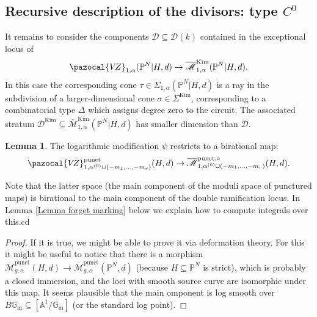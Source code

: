 \documentclass[11pt]{amsart}
\newcommand{\Kim}{\operatorname{Kim}}
\newcommand{\Mpunct}[4]{\overline{\mathcal{M}}^{\operatorname{punct}}_{#1,#2}(#3,#4)}
\newcommand{\PP}{\mathbb P}
\newcommand{\VZ}{\pazocal{V\!Z}}
\renewcommand{\to}{\rightarrow}
\newcommand{\Aaff}{\mathbb{A}}
\newcommand{\Gm}{\mathbb{G}_{\text{m}}}
\newcommand{\Mcal}{\mathcal{M}}
\newcommand{\Dcal}{\mathcal{D}}
\newcommand{\ol}[1]{\overline{#1}}
\theoremstyle{definition}
\newtheorem{lem}[thm]{Lemma}
\theoremstyle{definition}
\begin{document}
\subsection{Recursive description of the divisors: type $C^0$} It remains to consider the components $\Dcal \subseteq \Dcal(k)$ contained in the exceptional locus of
\begin{equation*} \VZ_{1,\alpha}(\PP^N|H,d) \to \ol\Mcal^{\Kim}_{1,\alpha}(\PP^N|H,d). \end{equation*}
In this case the corresponding cone $\tau \in \Sigma_{1,\alpha}(\PP^N|H,d)$ is a ray in the subdivision of a larger-dimensional cone $\sigma \in \Sigma^{\Kim}$, corresponding to a combinatorial type $\Delta$ which assigns degree zero to the circuit. The associated stratum $\Dcal^{\Kim} \subseteq \ol\Mcal^{\Kim}_{1,\alpha}(\PP^N|H,d)$ has smaller dimension than $\Dcal$.


\begin{lem} The logarithmic modification $\psi$ restricts to a birational map:
\begin{equation*}\VZ^{\operatorname{punct}}_{1,\alpha^{(0)}\cup(-m_1,\ldots,-m_r)}(H,d) \to \ol\Mcal^{\operatorname{punct},\circ}_{1,\alpha^{(0)}\cup(-m_1,\ldots,-m_r)}(H,d).\end{equation*}
\end{lem}
Note that the latter space (the main component of the moduli space of punctured maps) is birational to the main component of the double ramification locus. In Lemma \ref{Lemma forget marking} below we explain how to compute integrals over this.cd 
\begin{proof}
If it is true, we might be able to prove it via deformation theory. For this it might be useful to notice that there is a morphism $\Mpunct{g}{\alpha}{H}{d}\to \Mpunct{g}{\alpha}{\PP^N}{d}$ (because $H\subseteq\PP^N$ is strict), which is probably a closed immersion, and the loci with smooth source curve are isomorphic under this map. It seems plausible that the main omponent is log smooth over $B\Gm\subseteq[\Aaff^1/\Gm]$ (or the standard log point).
\end{proof}
\end{document}
